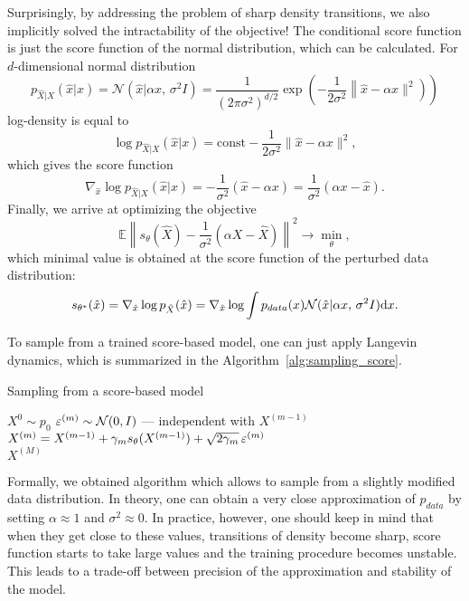 Surprisingly, by addressing the problem of sharp density transitions, we also implicitly solved the intractability of the objective! The conditional score function is just the score function of the normal distribution, which can be calculated. For $d$-dimensional normal distribution
\[
    p_{\hat{X} | X}(\hat{x} | x) = \mathcal{N}(\hat{x} | \alpha x,\, \sigma^2 I) = \frac{1}{(2 \pi \sigma^2)^{d/2}}\exp\left(-\frac{1}{2\sigma^2}\left\| \hat{x} - \alpha x \|^2 \right)\right)
\]
log-density is equal to
\[
    \log p_{\hat{X} | X}(\hat{x} | x) = \text{const} - \frac{1}{2\sigma^2}\|\hat{x} - \alpha x\|^2,
\]
which gives the score function
\[
    \nabla_{\hat{x}} \log p_{\hat{X} | X}(\hat{x} | x) = -\frac{1}{\sigma^2} (\hat{x} - \alpha x) = \frac{1}{\sigma^2}(\alpha x - \hat{x}).
\]
Finally, we arrive at optimizing the objective
\[
    \mathbb{E} \left\| s_\theta(\hat{X}) - \frac{1}{\sigma^2}(\alpha X - \hat{X}) \right\|^2 \rightarrow \min\limits_{\theta},
\]
which minimal value is obtained at the score function of the perturbed data distribution:
\[
    s_{\theta^*}(\hat{x}) = \nabla_{\hat{x}} \log p_{\hat{X}}(\hat{x}) = \nabla_{\hat{x}} \log \int p_{data}(x) \mathcal{N}(\hat{x} | \alpha x, \, \sigma^2 I)\mathrm{d} x.
\]

To sample from a trained score-based model, one can just apply Langevin dynamics, which is summarized in the Algorithm~\ref{alg:sampling_score}.
\begin{algorithm}
\caption{Sampling from a score-based model}\label{alg:sampling_score}
\begin{algorithmic}
\State $X^{0} \sim p_0$
    \State $\varepsilon^{(m)} \sim \mathcal{N}(0, I)$ --- independent with $X^{(m - 1)}$
    \State $X^{(m)} = X^{(m - 1)} + \gamma_m s_\theta(X^{(m - 1)}) + \sqrt{2 \gamma_m}\, \varepsilon^{(m)}$ 
\EndFor \\
\Return $X^{(M)}$
\end{algorithmic}
\end{algorithm}

Formally, we obtained algorithm which allows to sample from a slightly modified data distribution. In theory, one can obtain a very close approximation of $p_{data}$ by setting $\alpha \approx 1$ and $\sigma^2 \approx 0$. In practice, however, one should keep in mind that when they get close to these values, transitions of density become sharp, score function starts to take large values and the training procedure becomes unstable. This leads to a trade-off between precision of the approximation and stability of the model.

